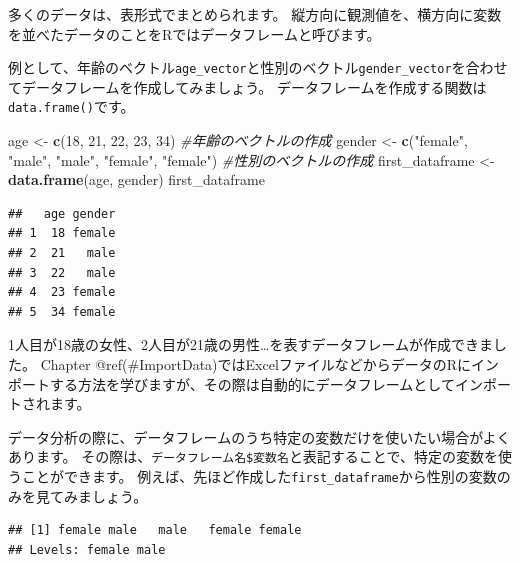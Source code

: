 \documentclass[]{book}
\newenvironment{Shaded}{\begin{snugshade}}{\end{snugshade}}
\newcommand{\KeywordTok}[1]{\textcolor[rgb]{0.13,0.29,0.53}{\textbf{#1}}}
\newcommand{\DecValTok}[1]{\textcolor[rgb]{0.00,0.00,0.81}{#1}}
\newcommand{\StringTok}[1]{\textcolor[rgb]{0.31,0.60,0.02}{#1}}
\newcommand{\CommentTok}[1]{\textcolor[rgb]{0.56,0.35,0.01}{\textit{#1}}}
\newcommand{\OperatorTok}[1]{\textcolor[rgb]{0.81,0.36,0.00}{\textbf{#1}}}
\newcommand{\NormalTok}[1]{#1}
\begin{document}
多くのデータは、表形式でまとめられます。
縦方向に観測値を、横方向に変数を並べたデータのことをRではデータフレームと呼びます。

例として、年齢のベクトル\texttt{age\_vector}と性別のベクトル\texttt{gender\_vector}を合わせてデータフレームを作成してみましょう。
データフレームを作成する関数は\texttt{data.frame()}です。

\begin{Shaded}
\begin{Highlighting}[]
\NormalTok{age <-}\StringTok{ }\KeywordTok{c}\NormalTok{(}\DecValTok{18}\NormalTok{, }\DecValTok{21}\NormalTok{, }\DecValTok{22}\NormalTok{, }\DecValTok{23}\NormalTok{, }\DecValTok{34}\NormalTok{) }\CommentTok{#年齢のベクトルの作成}
\NormalTok{gender <-}\StringTok{ }\KeywordTok{c}\NormalTok{(}\StringTok{"female"}\NormalTok{, }\StringTok{"male"}\NormalTok{, }\StringTok{"male"}\NormalTok{, }\StringTok{"female"}\NormalTok{, }\StringTok{"female"}\NormalTok{) }\CommentTok{#性別のベクトルの作成}
\NormalTok{first_dataframe <-}\StringTok{ }\KeywordTok{data.frame}\NormalTok{(age, gender)}
\NormalTok{first_dataframe}
\end{Highlighting}
\end{Shaded}

\begin{verbatim}
##   age gender
## 1  18 female
## 2  21   male
## 3  22   male
## 4  23 female
## 5  34 female
\end{verbatim}

1人目が18歳の女性、2人目が21歳の男性\ldots{}を表すデータフレームが作成できました。
Chapter
@ref(\#ImportData)ではExcelファイルなどからデータのRにインポートする方法を学びますが、その際は自動的にデータフレームとしてインポートされます。

データ分析の際に、データフレームのうち特定の変数だけを使いたい場合がよくあります。
その際は、\texttt{データフレーム名\$変数名}と表記することで、特定の変数を使うことができます。
例えば、先ほど作成した\texttt{first\_dataframe}から性別の変数のみを見てみましょう。

\begin{Shaded}
\end{Shaded}

\begin{verbatim}
## [1] female male   male   female female
## Levels: female male
\end{verbatim}
\end{document}
